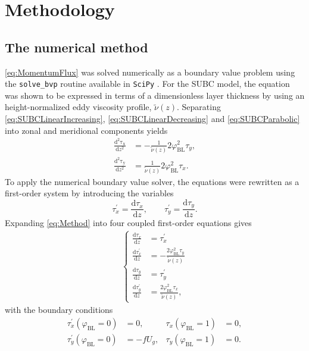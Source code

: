 \section{Methodology}
\subsection{The numerical method}
\autoref{eq:MomentumFlux} was solved numerically as a boundary value problem using the \texttt{solve\_bvp} routine available in \texttt{SciPy} \citep{virtanen2020}. For the SUBC model, the equation was shown to be expressed in terms of a dimensionless layer thickness by using an height-normalized eddy viscosity profile, $\tilde{\nu}(z)$. Separating \autoref{eq:SUBCLinearIncreasing}, \ref{eq:SUBCLinearDecreasing} and \ref{eq:SUBCParabolic} into zonal and meridional components yields
\begin{subequations}
    \label{eq:Method}
    \begin{align}
    \frac{\mathrm{d^2\tau_x}}{\mathrm{d} z^2}
    &=
    -\frac{1}{\tilde\nu(z)}2\varphi_\text{BL}^2 \tau_y,
    \\
    \frac{\mathrm{d^2\tau_y}}{\mathrm{d} z^2}
    &=
    \frac{1}{\tilde\nu(z)}2\varphi_\text{BL}^2 \tau_x.
\end{align}
\end{subequations}
To apply the numerical boundary value solver, the equations were rewritten as a first-order system by introducing the variables
\begin{equation}
    \tau_x^\prime = \frac{\mathrm{d} \tau_x}{\mathrm{d} z},
    \qquad
    \tau_y^\prime = \frac{\mathrm{d} \tau_y}{\mathrm{d} z}.
\end{equation}
Expanding \autoref{eq:Method} into four coupled first-order equations gives
\begin{align}
    \begin{cases} 
    \frac{\mathrm{d} \tau_x}{\mathrm{d} z}
    &= \tau_x^\prime
    \\
    \frac{\mathrm{d} \tau_x^\prime}{\mathrm{d} z}
    &=
    -\frac{2\varphi_\text{BL}^2 \tau_y}{\tilde\nu(z)}
    \\
    \frac{\mathrm{d} \tau_y}{\mathrm{d} z}
    &= \tau_y^\prime
    \\
    \frac{\mathrm{d} \tau_y^\prime}{\mathrm{d} z}
    &=\frac{2\varphi_\text{BL}^2 \tau_x}{\tilde\nu(z)},
    \end{cases}
    \label{eq:modelsolver}
\end{align}
with the boundary conditions
\begin{subequations}
    \begin{align}
    \tau_x^\prime(\varphi_\text{BL}=0) &= 0,
    &
    \tau_x(\varphi_\text{BL}=1) &= 0,
    \\
    \tau_y^\prime(\varphi_\text{BL}=0) &= -fU_g,
    &
    \tau_y(\varphi_\text{BL}=1) &= 0.
\end{align}
\end{subequations}
